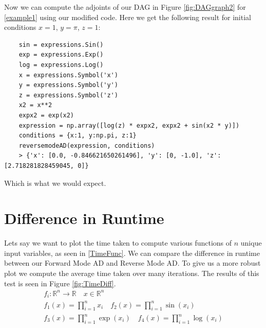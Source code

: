 \documentclass{article}
\begin{document}
Now we can compute the adjoints of our DAG in Figure \ref{fig:DAGgraph2} for \eqref{example1} using our modified code. Here we get the following result for initial conditions $x=1$, $y=\pi$, $z=1$:

\begin{verbatim}
    sin = expressions.Sin()
    exp = expressions.Exp()
    log = expressions.Log()
    x = expressions.Symbol('x')
    y = expressions.Symbol('y')
    z = expressions.Symbol('z')
    x2 = x**2
    expx2 = exp(x2)
    expression = np.array([log(z) * expx2, expx2 + sin(x2 * y)])
    conditions = {x:1, y:np.pi, z:1}
    reversemodeAD(expression, conditions)
    > {'x': [0.0, -0.846621650261496], 'y': [0, -1.0], 'z': [2.718281828459045, 0]}
\end{verbatim}

Which is what we would expect.



\newpage
\section{Difference in Runtime}

Lets say we want to plot the time taken to compute various functions of $n$ unique input variables, as seen in \eqref{TimeFunc}. We can compare the difference in runtime between our Forward Mode AD and Reverse Mode AD. To give us a more robust plot we compute the average time taken over many iterations. The results of this test is seen in Figure \ref{fig:TimeDiff}.
\begin{equation} \label{TimeFunc}
    \begin{gathered}
        f_i: \mathbb{R}^n \longrightarrow \mathbb{R} \quad x \in \mathbb{R}^n \\
        f_1(x) = \prod_{i=1}^n x_i  \quad f_2(x) = \prod_{i=1}^n \sin(x_i) \\
        f_3(x) = \prod_{i=1}^n \exp(x_i)  \quad f_4(x) = \prod_{i=1}^n \log(x_i)
    \end{gathered}
\end{equation}
\end{document}
